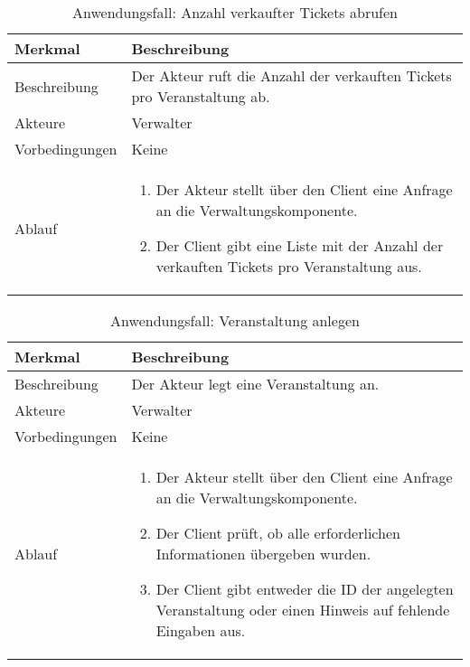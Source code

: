 \begin{table}[H]
    \centering
    \caption{Anwendungsfall: Anzahl verkaufter Tickets abrufen}
    \label{tab:use_case_get_number_of_tickets_per_event}
    \begin{tabularx}{\textwidth}{lX}
        \toprule
        \textbf{Merkmal} & \textbf{Beschreibung}  \\ \midrule
        Beschreibung    & Der Akteur ruft die Anzahl der verkauften Tickets pro Veranstaltung ab. \\
        Akteure         & Verwalter \\
        Vorbedingungen  & Keine \\
        Ablauf          & \begin{minipage}[t]{\linewidth}
        \vspace*{-3mm}
        \begin{enumerate}[leftmargin=*,nosep,after=\strut]
            \item Der Akteur stellt über den Client eine Anfrage an die Verwaltungskomponente.
            \item Der Client gibt eine Liste mit der Anzahl der verkauften Tickets pro Veranstaltung aus.
        \end{enumerate}
        \end{minipage} \\\bottomrule
    \end{tabularx}    
\setlength\belowcaptionskip{4pt}
\end{table}

\begin{table}[H]
    \centering
    \caption{Anwendungsfall: Veranstaltung anlegen}
    \label{tab:use_case_add_event}
    \begin{tabularx}{\textwidth}{lX}
        \toprule
        \textbf{Merkmal} & \textbf{Beschreibung}  \\ \midrule
        Beschreibung    & Der Akteur legt eine Veranstaltung an. \\
        Akteure         & Verwalter \\
        Vorbedingungen  & Keine \\
        Ablauf          & \begin{minipage}[t]{\linewidth}
        \vspace*{-3mm}
        \begin{enumerate}[leftmargin=*,nosep,after=\strut]
            \item Der Akteur stellt über den Client eine Anfrage an die Verwaltungskomponente.
            \item Der Client prüft, ob alle erforderlichen Informationen übergeben wurden.
            \item Der Client gibt entweder die ID der angelegten Veranstaltung oder einen Hinweis auf fehlende Eingaben aus.
        \end{enumerate}
        \end{minipage} \\\bottomrule
    \end{tabularx}    
\setlength\belowcaptionskip{4pt}
\end{table}


